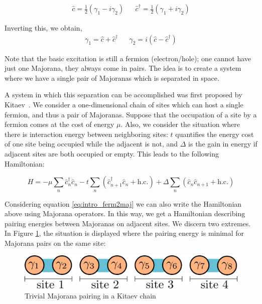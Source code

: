 	\begin{align}
		\hat{c} =  \frac{1}{2} \left( \gamma_1 - i\gamma_2 \right) && \hat{c}^\dagger = \frac{1}{2} \left( \gamma_1 + i\gamma_2 \right)
		\label{eq:intro_ferm2maj}
	\end{align}

	Inverting this, we obtain,
	\begin{align}
		\gamma_1 = \hat{c} + \hat{c}^\dagger && \gamma_2 = i \left( \hat{c} - \hat{c}^\dagger \right)
		\label{eq:intro_maj2ferm}
	\end{align}

	Note that the basic excitation is still a fermion (electron/hole); one cannot have just one Majorana, they always come in pairs.
	The idea is to create a system where we have a single pair of Majoranas which is separated in space.

	A system in which this separation can be accomplished was first proposed by Kitaev~\cite{kitaev_unpaired_2001}.
	We consider a one-dimensional chain of sites which can host a single fermion, and thus a pair of Majoranas.
	Suppose that the occupation of a site by a fermion comes at the cost of energy $\mu$.
	Also, we consider the situation where there is interaction energy between neighboring sites: $t$ quantifies the energy cost of one site being occupied while the adjacent is not, and $\Delta$ is the gain in energy if adjacent sites are both occupied or empty.
	This leads to the following Hamiltonian:

	\begin{equation}
		H = -\mu \sum_n \hat{c}_n^\dagger \hat{c}_n
		- t \sum_n \left( \hat{c}_{n+1}^\dagger \hat{c}_n +\text{h.c.} \right) 
		+ \Delta \sum_n \left( \hat{c}_n \hat{c}_{n+1} +\text{h.c.} \right) 
	\end{equation}

	Considering equation \eqref{eq:intro_ferm2maj} we can also write the Hamiltonian above using Majorana operators.
	In this way, we get a Hamiltonian describing pairing energies between Majoranas on adjacent sites.
	We discern two extremes.
	In Figure \ref{fig:trivial_majoranas}, the situation is displayed where the pairing energy is minimal for Majorana pairs on the same site:
	\begin{figure}[htb!]
	\centering
	\includegraphics[width=0.95\columnwidth]{images/majorana_trivial_pairing}
	\caption{Trivial Majorana pairing in a Kitaev chain}
	\label{fig:trivial_majoranas}
	\end{figure}

